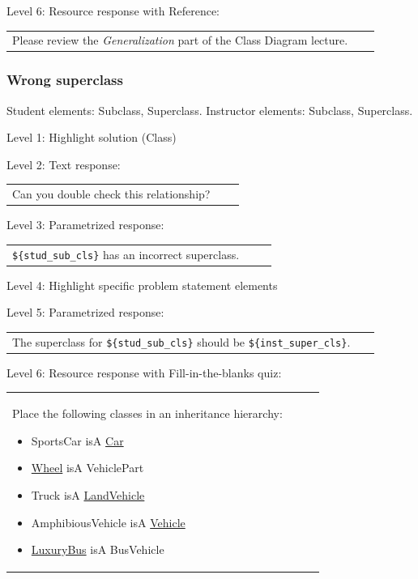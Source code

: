 \noindent Level 6: Resource response with Reference: \medskip

\begin{tabular}{|p{0.9\linewidth}}
Please review the \textit{Generalization} part of the Class Diagram lecture.
\end{tabular} \medskip


\subsubsection{Wrong superclass}

Student elements: Subclass, Superclass. Instructor elements: Subclass, Superclass. \medskip

\noindent Level 1: Highlight solution (Class) \medskip

\noindent Level 2: Text response: \medskip

\begin{tabular}{|p{0.9\linewidth}}
Can you double check this relationship?
\end{tabular} \medskip

\noindent Level 3: Parametrized response: \medskip

\begin{tabular}{|p{0.9\linewidth}}
\verb|${stud_sub_cls}| has an incorrect superclass.
\end{tabular} \medskip

\noindent Level 4: Highlight specific problem statement elements \medskip

\noindent Level 5: Parametrized response: \medskip

\begin{tabular}{|p{0.9\linewidth}}
The superclass for \verb|${stud_sub_cls}| should be \verb|${inst_super_cls}|.
\end{tabular} \medskip

\noindent Level 6: Resource response with Fill-in-the-blanks quiz: \medskip

\begin{tabular}{|p{0.9\linewidth}}

Place the following classes in an inheritance hierarchy:

\begin{itemize}
    \item SportsCar isA \underline{Car}
    \item \underline{Wheel} isA VehiclePart
    \item Truck isA \underline{LandVehicle}
    \item AmphibiousVehicle isA \underline{Vehicle}
    \item \underline{LuxuryBus} isA BusVehicle
\end{itemize}

\end{tabular} \medskip

